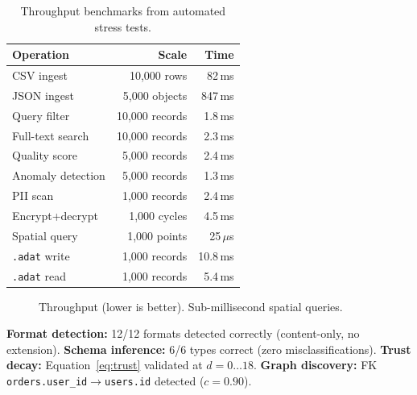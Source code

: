 \documentclass[10pt, twocolumn]{article}
\begin{document}
\begin{table}[t]
\caption{Throughput benchmarks from automated stress tests.}
\label{tab:bench}
\centering\scriptsize
\begin{tabular}{@{}lrr@{}}
\toprule
\textbf{Operation} & \textbf{Scale} & \textbf{Time} \\
\midrule
CSV ingest & 10{,}000 rows & 82\,ms \\
JSON ingest & 5{,}000 objects & 847\,ms \\
Query filter & 10{,}000 records & 1.8\,ms \\
Full-text search & 10{,}000 records & 2.3\,ms \\
Quality score & 5{,}000 records & 2.4\,ms \\
Anomaly detection & 5{,}000 records & 1.3\,ms \\
PII scan & 1{,}000 records & 2.4\,ms \\
Encrypt+decrypt & 1{,}000 cycles & 4.5\,ms \\
Spatial query & 1{,}000 points & 25\,$\mu$s \\
\texttt{.adat} write & 1{,}000 records & 10.8\,ms \\
\texttt{.adat} read & 1{,}000 records & 5.4\,ms \\
\bottomrule
\end{tabular}
\end{table}

\begin{figure}[t]
\centering
{}
\caption{Throughput (lower is better). Sub-millisecond spatial queries.}
\label{fig:throughput}
\end{figure}

\textbf{Format detection:} 12/12 formats detected correctly (content-only, no extension). \textbf{Schema inference:} 6/6 types correct (zero misclassifications). \textbf{Trust decay:} Equation~\ref{eq:trust} validated at $d=0\ldots18$. \textbf{Graph discovery:} FK \texttt{orders.user\_id}$\to$\texttt{users.id} detected ($c=0.90$).
\end{document}

